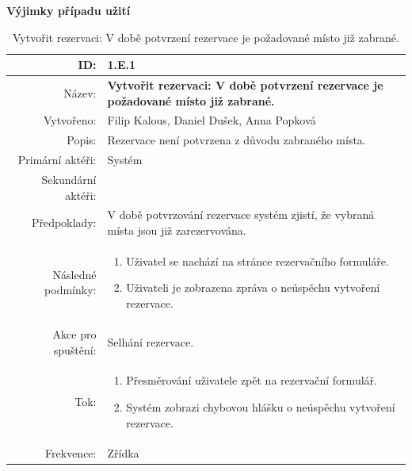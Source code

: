 \documentclass[a4paper,10pt]{article}
\begin{document}
\par{\textbf{Výjimky případu užití }}
\begin{table}[ht!]
{\renewcommand{\arraystretch}{1.3}
\begin{tabular}{| r | p{12cm} |}
	\hline
	ID: & 1.E.1 \\
    \hline
    Název: & \textbf{Vytvořit rezervaci: V době potvrzení rezervace je požadované místo již zabrané.} \\
    \hline
    Vytvořeno: & Filip Kalous, Daniel Dušek, Anna Popková \\
    \hline
    Popis: & Rezervace není potvrzena z důvodu zabraného místa. \\
    \hline
    Primární aktéři: & Systém \\
    \hline
    Sekundární aktéři: &  \\
    \hline
    Předpoklady: & V době potvrzování rezervace systém zjistí, že vybraná místa jsou již zarezervována.  \\
    \hline
    Následné podmínky: & 
	\begin{minipage}[t]{0.75\textwidth}
 		\begin{enumerate}[nosep,after=\strut]
 			\item Uživatel se nachází na stránce rezervačního formuláře.
 			\item Uživateli je zobrazena zpráva o neúspěchu vytvoření rezervace.
 		\end{enumerate}
    \end{minipage} \\
	\hline
    Akce pro spuštění: & Selhání rezervace. \\
    \hline
    Tok: & 
    \begin{minipage}[t]{0.75\textwidth}
    	\begin{enumerate}[nosep,after=\strut]
            \item Přesměrování uživatele zpět na rezervační formulář.
            \item Systém zobrazi chybovou hlášku o neúspěchu vytvoření rezervace.
    	\end{enumerate}
    \end{minipage} \\
    \hline
    Frekvence: & Zřídka \\
    \hline

\end{tabular}}
\caption{Vytvořit rezervaci: V době potvrzení rezervace je požadované místo již zabrané.}
\label{table:2}
\end{table}
\end{document}
